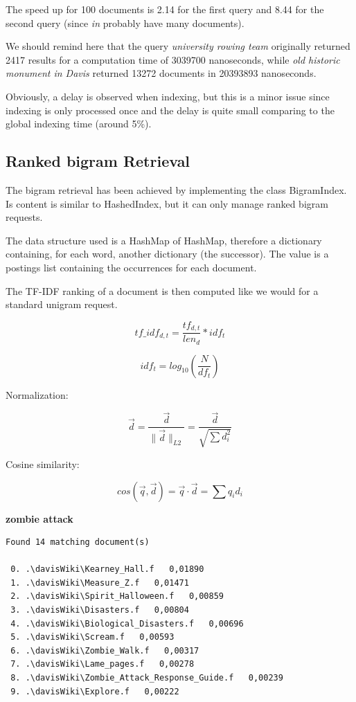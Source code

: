 The speed up for 100 documents is 2.14 for the first query and 8.44 for the second query (since \textit{in} probably have many documents).

We should remind here that the query \textit{university rowing team} originally returned 2417 results for a computation time of 3039700 nanoseconds, while \textit{old historic monument in Davis} returned 13272 documents in 20393893 nanoseconds.

Obviously, a delay is observed when indexing, but this is a minor issue since indexing is only processed once and the delay is quite small comparing to the global indexing time (around 5\%).


\subsection{Ranked bigram Retrieval}
The bigram retrieval has been achieved by implementing the class BigramIndex. Is content is similar to HashedIndex, but it can only manage ranked bigram requests.

The data structure used is a HashMap of HashMap, therefore a dictionary containing, for each word, another dictionary (the successor). The value is a postings list containing the occurrences for each document. 

The TF-IDF ranking of a document is then computed like we would for a standard unigram request.

\begin{equation}
tf\_idf_{d,t} = \frac{tf_{d,t}}{len_d} * idf_t
\end{equation}

\begin{equation}
idf_t = log_{10}(\frac{N}{df_t})
\end{equation}

Normalization:

\begin{equation}
\vec{d} = \frac{\vec{d}}{\|\vec{d}\|_{L2}} = \frac{\vec{d}}{\sqrt{\sum{d_i^2}}}
\end{equation}

Cosine similarity:

\begin{equation}
cos(\vec{q}, \vec{d}) = \vec{q} \cdot \vec{d} = \sum{q_i d_i}
\end{equation}


\textbf{zombie attack}

\begin{verbatim}
Found 14 matching document(s)

 0. .\davisWiki\Kearney_Hall.f   0,01890
 1. .\davisWiki\Measure_Z.f   0,01471
 2. .\davisWiki\Spirit_Halloween.f   0,00859
 3. .\davisWiki\Disasters.f   0,00804
 4. .\davisWiki\Biological_Disasters.f   0,00696
 5. .\davisWiki\Scream.f   0,00593
 6. .\davisWiki\Zombie_Walk.f   0,00317
 7. .\davisWiki\Lame_pages.f   0,00278
 8. .\davisWiki\Zombie_Attack_Response_Guide.f   0,00239
 9. .\davisWiki\Explore.f   0,00222
\end{verbatim}

